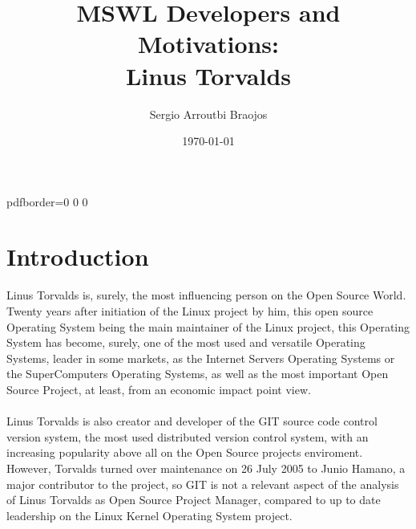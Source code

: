 \documentclass[11pt]{article}
\title{\textbf{MSWL Developers and Motivations:\\
Linus Torvalds}}
\author{Sergio Arroutbi Braojos}
\date{\today}
\begin{document}
\hypersetup
{   
pdfborder={0 0 0}
}
   
\maketitle

\pagebreak

\tableofcontents

\pagebreak

\section{Introduction}
Linus Torvalds is, surely, the most influencing person on the Open Source World. Twenty years after initiation of the Linux project by him, this open source Operating System being the main maintainer of the Linux project, this Operating System has become, surely, one of the most used and versatile Operating Systems, leader in some markets, as the Internet Servers Operating Systems or the SuperComputers Operating Systems, as well as the most important Open Source Project, at least, from an economic impact point view.\\
\\
Linus Torvalds is also creator and developer of the GIT source code control version system, the most used distributed version control system, with an increasing popularity above all on the Open Source projects enviroment. However, Torvalds turned over maintenance on 26 July 2005 to Junio Hamano, a major contributor to the project, so GIT is not a relevant aspect of the analysis of Linus Torvalds as Open Source Project Manager, compared to up to date leadership on the Linux Kernel Operating System project.

\pagebreak
\end{document}
